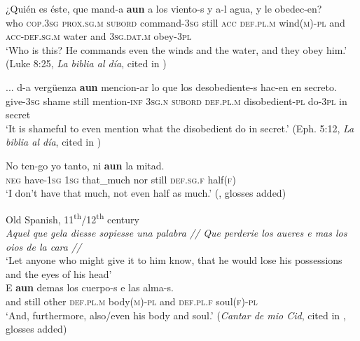 \begin{exe}
	\ex\label{exAppendixSpanishAunScalarAdditive1}
	\gll ¿Quién es éste, que mand-a \textbf{aun} a los viento-s y a-l agua, y le obedec-en?\\
	\phantom{¿}who \textsc{cop}.3\textsc{sg} \textsc{prox}.\textsc{sg}.\textsc{m} \textsc{subord} command-3\textsc{sg} still \textsc{acc} \textsc{def}.\textsc{pl}.\textsc{m} wind(\textsc{m})-\textsc{pl} and \textsc{acc}-\textsc{def}.\textsc{sg}.\textsc{m} water and 3\textsc{sg}.\textsc{dat}.\textsc{m} obey-3\textsc{pl}\\
	\glt \lq Who is this? He commands even the winds and the water, and they obey him.' (Luke 8:25, \textit{La biblia al día}, cited in \cite[3]{GastvanderAuwera2011})
	
	\ex\label{exAppendixSpanishAunScalarAdditive2}
	\gll ... d-a vergüenza \textbf{aun} mencion-ar lo que los desobediente-s hac-en en secreto.\\
	{} give-3\textsc{sg} shame still mention-\textsc{inf} 3\textsc{sg}.\textsc{n} \textsc{subord} \textsc{def}.\textsc{pl}.\textsc{m} disobedient-\textsc{pl} do-3\textsc{pl} in secret\\
	\glt \lq It is shameful to even mention what the disobedient do in secret.' (Eph. 5:12, \textit{La biblia al día}, cited in \cite[2]{GastvanderAuwera2011})
	
	\ex\label{exAppendixSpanishAunScalarAdditive3}
	\gll No ten-go yo tanto, ni \textbf{aun} la mitad.\\
\textsc{neg} have-1\textsc{sg} 1\textsc{sg} that\_much nor still \textsc{def}.\textsc{sg}.\textsc{f} half(\textsc{f})\\
\glt \lq I don't have that much, not even half as much.\rq{ }(\cite[s.v. \textit{aun}]{RAEDictionary}, glosses added)

	\ex Old Spanish,  11\textsuperscript{th}/12\textsuperscript{th} century\label{exAppendixSpanishAunScalarAdditive4}\\
	\textit{Aquel que gela diesse sopiesse una palabra // Que perderie los aueres e mas los oios de la cara //}\\
	\lq Let anyone who might give it to him know, that he would lose his possessions and the eyes of his head\rq{}\\
	\gll  E \textbf{aun} demas los cuerpo-s e las alma-s.\\
	and still  other \textsc{def}.\textsc{pl}.\textsc{m} body(\textsc{m})-\textsc{pl} and \textsc{def}.\textsc{pl}.\textsc{f} soul(\textsc{f})-\textsc{pl}\\
	\glt \lq And, furthermore, also/even his body and soul.\rq{ }(\textit{Cantar de mio Cid}, cited in \cite[79]{Trujillo1990}, glosses added)	
	
\end{exe}

